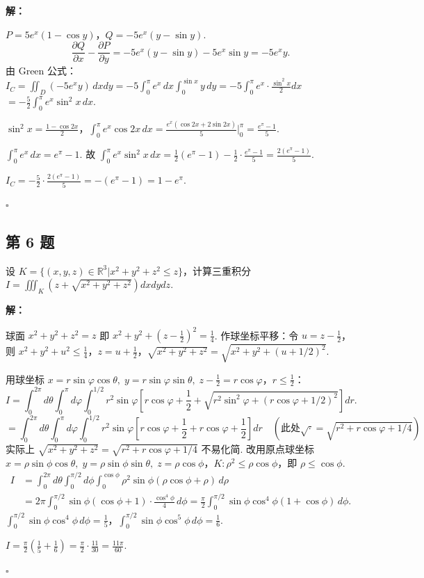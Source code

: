 \documentclass[12pt,a4paper]{article}
\newenvironment{sol}[1][解]{%
  \par\medskip\noindent\textbf{#1：}\itshape\par\noindent\ignorespaces
}{%
  \par\hfill$\square$\par\medskip
}
\begin{document}
\begin{sol}$P=5e^x(1-\cos y)$，$Q=-5e^x(y-\sin y)$.
  $$\frac{\partial Q}{\partial x}-\frac{\partial P}{\partial
  y}=-5e^x(y-\sin y)-5e^x\sin y=-5e^x y.$$
  由 Green 公式：$I_C=\iint_D(-5e^x
  y)\,dxdy=-5\int_0^{\pi}e^x\,dx\int_0^{\sin
  x}y\,dy=-5\int_0^{\pi}e^x\cdot\frac{\sin^2 x}{2}dx$
  $=-\frac{5}{2}\int_0^{\pi}e^x\sin^2 x\,dx.$

  $\sin^2 x=\frac{1-\cos 2x}{2}$，$\int_0^{\pi}e^x\cos
  2x\,dx=\frac{e^x(\cos 2x+2\sin 2x)}{5}\Big|_0^{\pi}=\frac{e^{\pi}-1}{5}$.

  $\int_0^{\pi}e^x\,dx=e^{\pi}-1$. 故 $\int_0^{\pi}e^x\sin^2
  x\,dx=\frac{1}{2}(e^{\pi}-1)-\frac{1}{2}\cdot\frac{e^{\pi}-1}{5}=\frac{2(e^{\pi}-1)}{5}$.

  $I_C=-\frac{5}{2}\cdot\frac{2(e^{\pi}-1)}{5}=-(e^{\pi}-1)=1-e^{\pi}.$

\end{sol}
\subsection*{第 6 题}
设 $K=\{(x,y,z)\in\mathbb{R}^3|x^2+y^2+z^2\le z\}$，计算三重积分
$I=\iiint_{K}(z+\sqrt{x^2+y^2+z^2})dxdydz$.

\begin{sol}球面 $x^2+y^2+z^2=z$ 即
  $x^2+y^2+(z-\frac{1}{2})^2=\frac{1}{4}$. 作球坐标平移：令 $u=z-\frac{1}{2}$，则
  $x^2+y^2+u^2\le\frac{1}{4}$，$z=u+\frac{1}{2}$，$\sqrt{x^2+y^2+z^2}=\sqrt{x^2+y^2+(u+1/2)^2}$.

  用球坐标 $x=r\sin\varphi\cos\theta,\; y=r\sin\varphi\sin\theta,\;
  z-\frac{1}{2}=r\cos\varphi$，$r\le\frac{1}{2}$：
  $$I=\int_0^{2\pi}d\theta\int_0^{\pi}d\varphi\int_0^{1/2}r^2\sin\varphi\left[r\cos\varphi+\frac{1}{2}+\sqrt{r^2\sin^2\varphi+(r\cos\varphi+1/2)^2}\right]dr.$$
  $$=\int_0^{2\pi}d\theta\int_0^{\pi}d\varphi\int_0^{1/2}r^2\sin\varphi\left[r\cos\varphi+\frac{1}{2}+r\cos\varphi+\frac{1}{2}\right]dr\quad(\text{此处}\sqrt{\cdot}=\sqrt{r^2+r\cos\varphi+1/4})$$
  实际上 $\sqrt{x^2+y^2+z^2}=\sqrt{r^2+r\cos\varphi+1/4}$ 不易化简. 改用原点球坐标
  $x=\rho\sin\phi\cos\theta,\; y=\rho\sin\phi\sin\theta,\;
  z=\rho\cos\phi$，$K: \rho^2\le\rho\cos\phi$，即 $\rho\le\cos\phi$.
  \begin{align*}
    I&=\int_0^{2\pi}d\theta\int_0^{\pi/2}d\phi\int_0^{\cos\phi}\rho^2\sin\phi(\rho\cos\phi+\rho)\,d\rho\\
    &=2\pi\int_0^{\pi/2}\sin\phi(\cos\phi+1)\cdot\frac{\cos^4\phi}{4}\,d\phi=\frac{\pi}{2}\int_0^{\pi/2}\sin\phi\cos^4\phi(1+\cos\phi)\,d\phi.
  \end{align*}
  $\int_0^{\pi/2}\sin\phi\cos^4\phi\,d\phi=\frac{1}{5}$，$\int_0^{\pi/2}\sin\phi\cos^5\phi\,d\phi=\frac{1}{6}$.

  $I=\frac{\pi}{2}\left(\frac{1}{5}+\frac{1}{6}\right)=\frac{\pi}{2}\cdot\frac{11}{30}=\frac{11\pi}{60}.$

\end{sol}
\end{document}
